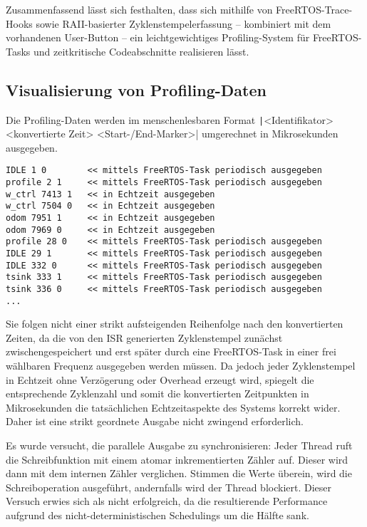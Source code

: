 Zusammenfassend lässt sich festhalten, dass sich mithilfe von
FreeRTOS-Trace-Hooks sowie RAII-basierter Zyklenstempelerfassung -- kombiniert
mit dem vorhandenen User-Button -- ein leichtgewichtiges Profiling-System für
FreeRTOS-Tasks und zeitkritische Codeabschnitte realisieren lässt.

\subsection{Visualisierung von Profiling-Daten}

Die Profiling-Daten werden im menschenlesbaren Format
\texttt|<Identifikator> <konvertierte Zeit> <Start-/End-Marker>|
umgerechnet in Mikrosekunden ausgegeben.

\begin{code}
\begin{verbatim}
IDLE 1 0        << mittels FreeRTOS-Task periodisch ausgegeben
profile 2 1     << mittels FreeRTOS-Task periodisch ausgegeben
w_ctrl 7413 1   << in Echtzeit ausgegeben
w_ctrl 7504 0   << in Echtzeit ausgegeben
odom 7951 1     << in Echtzeit ausgegeben
odom 7969 0     << in Echtzeit ausgegeben
profile 28 0    << mittels FreeRTOS-Task periodisch ausgegeben
IDLE 29 1       << mittels FreeRTOS-Task periodisch ausgegeben
IDLE 332 0      << mittels FreeRTOS-Task periodisch ausgegeben
tsink 333 1     << mittels FreeRTOS-Task periodisch ausgegeben
tsink 336 0     << mittels FreeRTOS-Task periodisch ausgegeben
...
\end{verbatim}
\end{code}

Sie folgen nicht einer strikt aufsteigenden Reihenfolge nach den konvertierten
Zeiten, da die von den ISR generierten Zyklenstempel zunächst
zwischengespeichert und erst später durch eine FreeRTOS-Task in einer frei
wählbaren Frequenz ausgegeben werden müssen. Da jedoch jeder Zyklenstempel in
Echtzeit ohne Verzögerung oder Overhead erzeugt wird, spiegelt die entsprechende
Zyklenzahl und somit die konvertierten Zeitpunkten in Mikrosekunden die
tatsächlichen Echtzeitaspekte des Systems korrekt wider. Daher ist eine strikt
geordnete Ausgabe nicht zwingend erforderlich.

Es wurde versucht, die parallele Ausgabe zu synchronisieren: Jeder Thread ruft
die Schreibfunktion mit einem atomar inkrementierten Zähler auf. Dieser wird
dann mit dem internen Zähler verglichen. Stimmen die Werte überein, wird die
Schreiboperation ausgeführt, andernfalls wird der Thread blockiert. Dieser
Versuch erwies sich als nicht erfolgreich, da die resultierende Performance
aufgrund des nicht-deterministischen Schedulings um die Hälfte sank.

